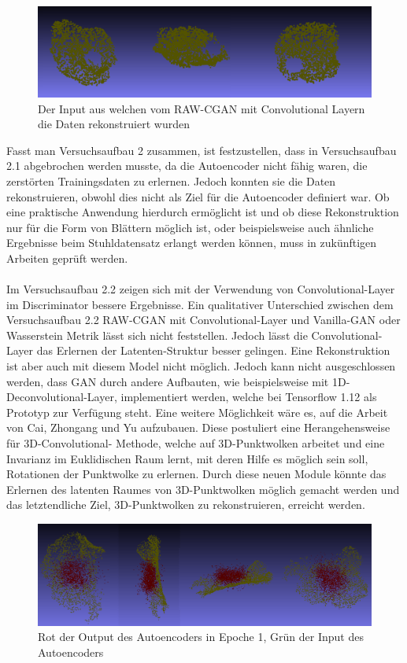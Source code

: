 \documentclass{llncs}
\begin{document}
\begin{figure}[htbp] 
	\centering
	\includegraphics[width=1.0\textwidth]{raw_cgan_ws_real.png}
	\caption{Der Input aus welchen vom RAW-CGAN mit Convolutional Layern die Daten rekonstruiert wurden}
	\label{fig:Bild83}
\end{figure}
Fasst man Versuchsaufbau 2 zusammen, ist festzustellen, dass in Versuchsaufbau 2.1 abgebrochen werden musste, da die Autoencoder nicht fähig waren, die zerstörten Trainingsdaten zu erlernen. Jedoch konnten sie die Daten rekonstruieren, obwohl dies nicht als Ziel für die Autoencoder definiert war. Ob eine praktische Anwendung hierdurch ermöglicht ist und ob diese Rekonstruktion nur für die Form von Blättern möglich ist, oder beispielsweise auch ähnliche Ergebnisse beim Stuhldatensatz erlangt werden können, muss in zukünftigen Arbeiten geprüft werden.
\\\\
Im Versuchsaufbau 2.2 zeigen sich mit der Verwendung von Convolutional-Layer im Discriminator bessere Ergebnisse. Ein qualitativer Unterschied zwischen dem Versuchsaufbau 2.2 RAW-CGAN mit Convolutional-Layer und Vanilla-GAN oder Wasserstein Metrik lässt sich nicht feststellen. Jedoch lässt die Convolutional-Layer das Erlernen der Latenten-Struktur besser gelingen. Eine Rekonstruktion ist aber auch mit diesem Model nicht möglich. Jedoch kann nicht ausgeschlossen werden, dass GAN durch andere Aufbauten, wie beispielsweise mit 1D-Deconvolutional-Layer, implementiert werden, welche bei Tensorflow 1.12 als Prototyp zur Verfügung steht. Eine weitere Möglichkeit wäre es, auf die Arbeit von Cai, Zhongang  und Yu \cite{3d-conv} aufzubauen. Diese postuliert eine Herangehensweise für 3D-Convolutional- Methode, welche auf 3D-Punktwolken arbeitet und eine Invarianz im Euklidischen Raum lernt, mit deren Hilfe es möglich sein soll, Rotationen der Punktwolke zu erlernen. Durch diese neuen Module könnte das Erlernen des latenten Raumes von 3D-Punktwolken möglich gemacht werden und das letztendliche Ziel, 3D-Punktwolken zu rekonstruieren, erreicht werden.   
\begin{figure}[htbp] 
	\centering
	\includegraphics[width=1.0\textwidth]{problem_autoencoder.png}
	\caption{Rot der Output des Autoencoders in Epoche 1, Grün der Input des Autoencoders }
	\label{fig:Bild1005}
\end{figure}
\end{document}
